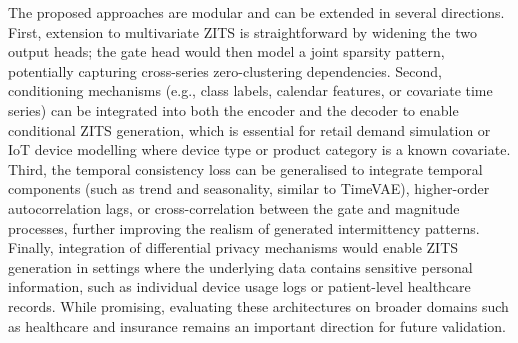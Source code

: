 \documentclass[make,article,submit,moreauthors]{Definitions/mdpi}
\begin{document}
The proposed approaches are modular and can be extended in several directions. First, extension to multivariate ZITS is straightforward by widening the two output heads; the gate head would then model a joint sparsity pattern, potentially capturing cross-series zero-clustering dependencies. Second, conditioning mechanisms (e.g., class labels, calendar features, or covariate time series) can be integrated into both the encoder and the decoder to enable conditional ZITS generation, which is essential for retail demand simulation or IoT device modelling where device type or product category is a known covariate. Third, the temporal consistency loss can be generalised to integrate temporal components (such as trend and seasonality, similar to TimeVAE), higher-order autocorrelation lags, or cross-correlation between the gate and magnitude processes, further improving the realism of generated intermittency patterns. Finally, integration of differential privacy mechanisms would enable ZITS generation in settings where the underlying data contains sensitive personal information, such as individual device usage logs or patient-level healthcare records. While promising, evaluating these architectures on broader domains such as healthcare and insurance remains an important direction for future validation.


\vspace{6pt} 






\end{document}
